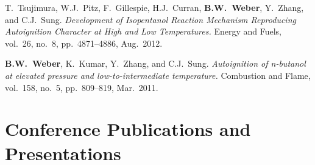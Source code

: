 \begin{bibmune}
\item T.\ Tsujimura, W.J.\ Pitz, F.\ Gillespie, H.J.\ Curran,
        \textbf{B.W.\ Weber}, Y.\ Zhang, and C.J.\ Sung.
        \textit{Development of Isopentanol Reaction Mechanism
        Reproducing Autoignition Character at High and Low
        Temperatures.} Energy and Fuels, vol.\ 26, no.\ 8, pp.\ 4871--4886,
        Aug.\ 2012. 

\item \textbf{B.W.\ Weber}, K.\ Kumar, Y.\ Zhang, and C.J.\ Sung.
        \textit{Autoignition of n-butanol at elevated pressure and
        low-to-intermediate temperature.} Combustion and Flame,
        vol.\ 158, no.\ 5, pp.\ 809--819, Mar.\ 2011.
\end{bibmune}


\section{{\sectionfont Conference Publications and Presentations}}

